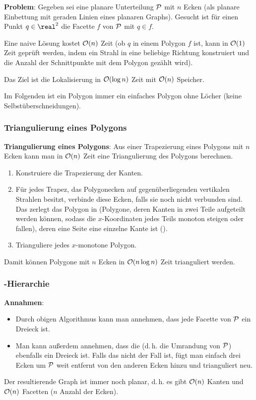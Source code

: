 \textbf{Problem}:
Gegeben sei eine planare Unterteilung $\P$ mit $n$ Ecken
(als planare Einbettung mit geraden Linien eines planaren Graphs).
Gesucht ist für einen Punkt $q \in \real^2$ die Facette $f$ von $\P$ mit $q \in f$.

Eine naive Lösung kostet $\O(n)$ Zeit
(ob $q$ in einem Polygon $f$ ist, kann in $\O(1)$ Zeit geprüft werden, indem ein
Strahl in eine beliebige Richtung konstruiert und die Anzahl der Schnittpunkte mit dem Polygon
gezählt wird).

Das Ziel ist die Lokalisierung in $\O(\log n)$ Zeit mit $\O(n)$ Speicher.

Im Folgenden ist ein Polygon immer ein einfaches Polygon ohne Löcher
(keine Selbstüberschneidungen).

\subsubsection{%
    Triangulierung eines Polygons%
}

\textbf{Triangulierung eines Polygons}:
Aus einer Trapezierung eines Polygons mit $n$ Ecken kann man in $\O(n)$ Zeit
eine Triangulierung des Polygons berechnen.
\begin{enumerate}
    \item
    Konstruiere die Trapezierung der Kanten.
    
    \item
    Für jedes Trapez, das Polygonecken auf gegenüberliegenden vertikalen Strahlen besitzt,
    verbinde diese Ecken, falls sie noch nicht verbunden sind.
    Das zerlegt das Polygon in 
    (Polygone, deren Kanten in zwei Teile aufgeteilt werden können,
    sodass die $x$-Koordinaten jedes Teils monoton steigen oder fallen),
    deren eine Seite eine einzelne Kante ist
    ().
    
    \item
    Trianguliere jedes $x$-monotone Polygon.
\end{enumerate}
Damit können Polygone mit $n$ Ecken in $\O(n \log n)$ Zeit trianguliert werden.

\pagebreak

\subsubsection{%
    -Hierarchie%
}

\textbf{Annahmen}:
\begin{itemize}
    \item
    Durch obigen Algorithmus kann man annehmen, dass jede Facette von $\P$ ein Dreieck ist.
    
    \item
    Man kann außerdem annehmen, dass die  (d.\,h. die Umrandung von $\P$)
    ebenfalls ein Dreieck ist.
    Falls das nicht der Fall ist, fügt man einfach drei Ecken um $\P$ weit entfernt von den
    anderen Ecken hinzu und trianguliert neu.
\end{itemize}
Der resultierende Graph ist immer noch planar, d.\,h. es gibt $\O(n)$ Kanten und $\O(n)$ Facetten
($n$ Anzahl der Ecken).


